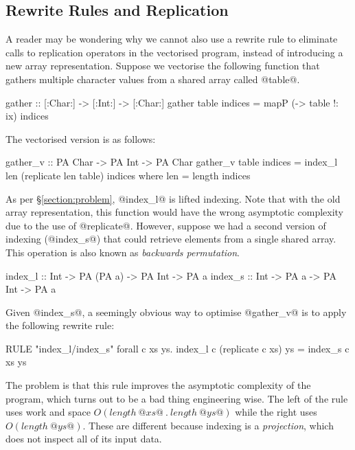 \subsection{Rewrite Rules and Replication}
\label{section:RewriteRules}
A reader may be wondering why we cannot also use a rewrite rule to eliminate calls to replication operators in the vectorised program, instead of introducing a new array representation. Suppose we vectorise the following function that gathers multiple character values from a shared array called @table@. 
\begin{small}
\begin{code}
  gather :: [:Char:] -> [:Int:] -> [:Char:]
  gather table indices
   = mapP (\ix -> table !: ix) indices
\end{code}
\end{small}
%
The vectorised version is as follows:
%
\begin{small}
\begin{code}
 gather_v :: PA Char -> PA Int -> PA Char
 gather_v table indices
  = index_l len (replicate len table) indices
  where len = length indices
\end{code}
\end{small}
%
As per \S\ref{section:problem}, @index_l@ is lifted indexing. Note that with the old array representation, this function would have the wrong asymptotic complexity due to the use of @replicate@. However, suppose we had a second version of indexing (@index_s@) that could retrieve elements from a single shared array. This operation is also known as \emph{backwards permutation}.
\begin{small}
\begin{code}
 index_l :: Int -> PA (PA a) -> PA Int -> PA a
 index_s :: Int ->     PA a  -> PA Int -> PA a
\end{code}
\end{small}
%
Given @index_s@, a seemingly obvious way to optimise @gather_v@ is to apply the following rewrite rule:
%
\begin{small}
\begin{code}
  RULE "index_l/index_s" forall c xs ys.
        index_l c (replicate c xs) ys = index_s c xs ys
\end{code}
\end{small}
%
The problem is that this rule improves the asymptotic complexity of the program, which turns out to be a bad thing engineering wise. The left of the rule uses work and space $O(length~ @xs@ ~.~ length~ @ys@)$ while the right uses $O(length~ @ys@)$. These are different because indexing is a \emph{projection}, which does not inspect all of its input data. 

